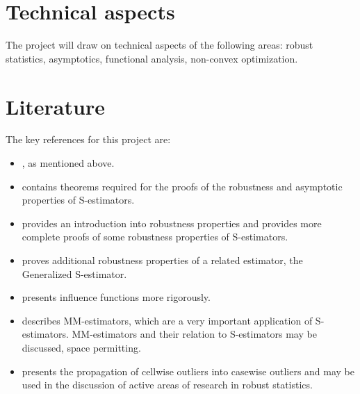 \documentclass[]{STAT_547C}
\begin{document}
\section{Technical aspects}

The project will draw on technical aspects of the following areas: robust statistics, asymptotics, functional analysis, non-convex optimization.



\section{Literature}

The key references for this project are:

\begin{itemize}
  \item \cite{rousseeuw1984robust}, as mentioned above.
  \item \cite{rousseeuw1984least} contains theorems required for the proofs of the robustness and asymptotic properties of S-estimators.
  \item \cite[Ch.~3]{maronna2019robust} provides an introduction into robustness properties and \cite[Ch.~5]{maronna2019robust} provides more complete proofs of some robustness properties of S-estimators.
  \item \cite{croux1994generalized} proves additional robustness properties of a related estimator, the Generalized S-estimator.
  \item \cite[Ch.~2]{hampel2011robust} presents influence functions more rigorously.
  \item \cite{yohai1987high} describes MM-estimators, which are a very important application of S-estimators. MM-estimators and their relation to S-estimators may be discussed, space permitting.
  \item \cite{alqallaf2009propagation} presents the propagation of cellwise outliers into casewise outliers and may be used in the discussion of active areas of research in robust statistics.
  
\end{itemize}
\end{document}
